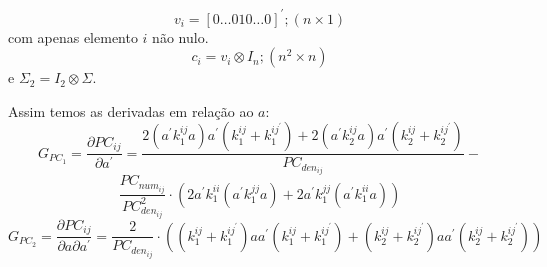 \documentclass[a4paper,10pt]{article}
\begin{document}
\begin{equation}
v_{i} = [0 \dots 0 1 0 \dots 0]^{'}; (n \times 1)
\end{equation}
com apenas elemento $i$ não nulo.
\begin{equation}
c_{i} = v_{i} \otimes I_{n}; (n^{2} \times n)
\end{equation}
e $\Sigma_{2} = I_{2} \otimes \Sigma$.

Assim temos as derivadas em relação ao $a$:
\begin{equation}
G_{PC_1} = \frac{\partial PC_{ij}}{\partial a^{'}} = \frac{2 (a^{'} k_{1}^{ij} a) a^{'} (k_{1}^{ij} + k_{1}^{ij^{'}}) + 2 (a^{'} k_{2}^{ij} a) a^{'} (k_{2}^{ij} + k_{2}^{ij^{'}}) } 
{PC_{den_{ij}}} - 
\end{equation}
\begin{equation}
\frac{PC_{num_{ij}}}{PC_{den_{ij}}^{2}} \cdot (2 a^{'} k_{1}^{ii} (a^{'} k_{1}^{jj} a) + 2 a^{'} k_{1}^{jj} ( a^{'} k_{1}^{ii} a))
\end{equation}
\begin{equation}
G_{PC_2} = \frac{\partial PC_{ij}}{\partial a \partial a^{'}} = \frac{2}{PC_{den_{ij}}} \cdot ((k_{1}^{ij} + k_{1}^{ij^{'}}) a a^{'} (k_{1}^{ij} + k_{1}^{ij^{'}}) + (k_{2}^{ij} + k_{2}^{ij^{'}}) a a^{'} (k_{2}^{ij} + k_{2}^{ij^{'}}))
\end{equation}
\end{document}
